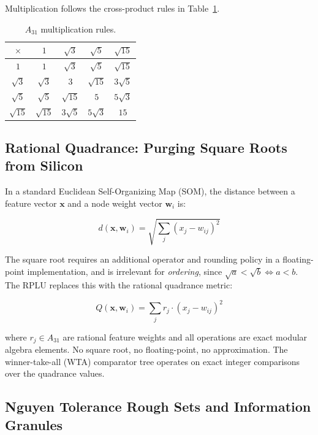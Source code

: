\documentclass[conference]{IEEEtran}
\begin{document}
Multiplication follows the cross-product rules in Table~\ref{tab:mult-rules}.

\begin{table}[ht]
\centering
	\caption{$A_{31}$ multiplication rules.}
\label{tab:mult-rules}
\begin{tabular}{c|cccc}
$\times$ & $1$ & $\sqrt{3}$ & $\sqrt{5}$ & $\sqrt{15}$ \\
\midrule
$1$      & $1$    & $\sqrt{3}$ & $\sqrt{5}$ & $\sqrt{15}$ \\
$\sqrt{3}$  & $\sqrt{3}$ & $3$       & $\sqrt{15}$  & $3\sqrt{5}$ \\
$\sqrt{5}$  & $\sqrt{5}$ & $\sqrt{15}$  & $5$        & $5\sqrt{3}$ \\
$\sqrt{15}$ & $\sqrt{15}$ & $3\sqrt{5}$ & $5\sqrt{3}$ & $15$
\end{tabular}
\end{table}

\subsection{Rational Quadrance: Purging Square Roots from Silicon}

In a standard Euclidean Self-Organizing Map (SOM), the distance between a
feature vector $\mathbf{x}$ and a node weight vector $\mathbf{w}_i$ is:

\begin{equation}
d(\mathbf{x}, \mathbf{w}_i) = \sqrt{\sum_j (x_j - w_{ij})^2}
\end{equation}

The square root requires an additional operator and rounding policy in a
floating-point implementation, and is irrelevant for \emph{ordering}, since $\sqrt{a} <
\sqrt{b} \iff a < b$. The RPLU replaces this with the rational quadrance
metric:

\begin{equation}
Q(\mathbf{x}, \mathbf{w}_i) = \sum_j r_j \cdot (x_j - w_{ij})^2
\end{equation}

	where $r_j \in A_{31}$ are rational feature weights and all
operations are exact modular algebra elements. No square root, no floating-point, no
approximation. The winner-take-all (WTA) comparator tree operates on exact
integer comparisons over the quadrance values.

\subsection{Nguyen Tolerance Rough Sets and Information Granules}
\end{document}
